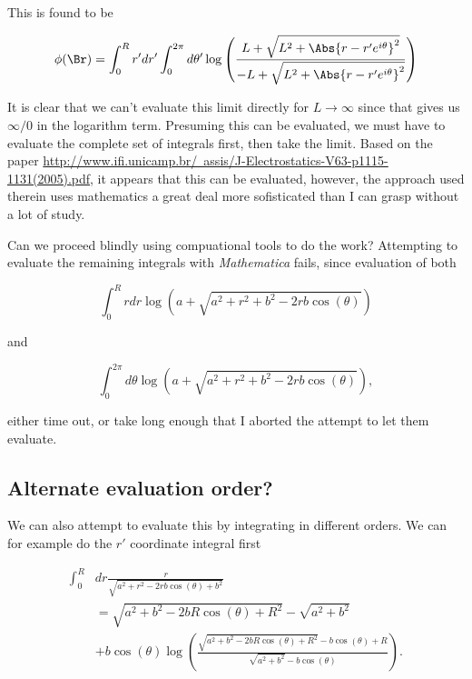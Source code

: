 This is found to be

\begin{equation}\label{eqn:cylinderPotential:50}
\phi(\Br) = \int_0^R r' dr' \int_0^{2 \pi } d\theta'
\log\left(\frac
{L+\sqrt{L^2+ \Abs{r - r' e^{ i \theta }}^2}}
{-L+\sqrt{L^2+ \Abs{r - r' e^{ i \theta }}^2}}
\right)
\end{equation}

It is clear that we can't evaluate this limit directly for $L \rightarrow \infty$ since that gives us $\infty/0$ in the logarithm term.  Presuming this can be evaluated, we must have to evaluate the complete set of integrals first, then take the limit.  Based on the paper \href{http://www.ifi.unicamp.br/~assis/J-Electrostatics-V63-p1115-1131(2005).pdf}{http://www.ifi.unicamp.br/~assis/J-Electrostatics-V63-p1115-1131(2005).pdf}, it appears that this can be evaluated, however, the approach used therein uses mathematics a great deal more sofisticated than I can grasp without a lot of study.

Can we proceed blindly using compuational tools to do the work?  Attempting to evaluate the remaining integrals with \textit{Mathematica} fails, since evaluation of both

\begin{equation}\label{eqn:cylinderPotential:70}
\int_0^R r dr \log \left(a+\sqrt{a^2+r^2+b^2-2 r b \cos (\theta )}\right) 
\end{equation}

and

\begin{equation}\label{eqn:cylinderPotential:90}
\int_0^{2 \pi } 
d\theta
\log \left(a+\sqrt{a^2+r^2+b^2-2 r b \cos (\theta )}\right) ,
\end{equation}

either time out, or take long enough that I aborted the attempt to let them evaluate.

\subsection{Alternate evaluation order?}

We can also attempt to evaluate this by integrating in different orders.  We can for example do the $r'$ coordinate integral first

\begin{equation}\label{eqn:cylinderPotential:110}
\begin{aligned}
\int_0^R 
&dr
\frac{r}{\sqrt{a^2+r^2-2 r b \cos (\theta )+b^2}}  \\
&=
\sqrt{a^2+b^2-2 b R \cos (\theta )+R^2} -\sqrt{a^2+b^2} \\
&+
b \cos (\theta ) \log \left(
\frac{
\sqrt{a^2+b^2-2 b R \cos (\theta )+R^2}-b \cos (\theta )+R}
{
\sqrt{a^2+b^2}-b \cos (\theta )
}
\right).
\end{aligned}
\end{equation}

